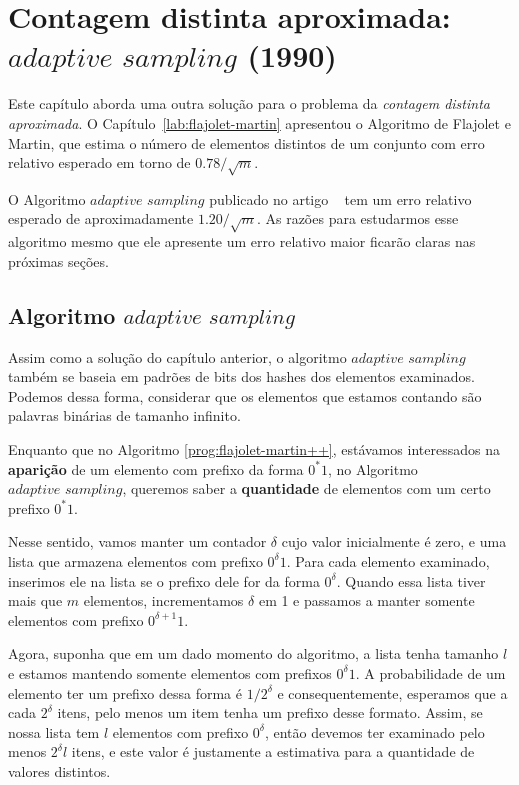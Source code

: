 \newcommand{\asampling}{\textit{adaptive sampling}}

\chapter{Contagem distinta aproximada: $\asampling$ (1990)}

Este capítulo aborda uma outra solução para o problema da \textit{contagem distinta aproximada}. O 
Capítulo~\ref{lab:flajolet-martin} apresentou o Algoritmo de Flajolet e Martin, que estima o número de elementos 
distintos de um conjunto com erro relativo esperado em torno de $0.78 / \sqrt{m}$. 

O Algoritmo $\asampling$ publicado no artigo ~\citep{adptive:sampling:90} tem um erro relativo esperado de 
aproximadamente $1.20 / \sqrt{m}$. As razões para estudarmos esse algoritmo mesmo que ele apresente um erro relativo 
maior ficarão claras nas próximas seções.

\section{Algoritmo $\asampling$}
\label{lab:chapter:04:01}

Assim como a solução do capítulo anterior, o algoritmo $\asampling$ também se baseia em padrões de bits dos hashes dos 
elementos examinados. Podemos dessa forma, considerar que os elementos que estamos contando são palavras binárias de 
tamanho infinito. 

Enquanto que no Algoritmo \ref{prog:flajolet-martin++}, estávamos interessados na \textbf{aparição} de um elemento com 
prefixo da forma $0^*1$, no Algoritmo $\asampling$, queremos saber a \textbf{quantidade} de elementos com um certo 
prefixo $0^*1$.

Nesse sentido, vamos manter um contador $\delta$ cujo valor inicialmente é zero, e uma lista que armazena elementos com 
prefixo $0^{\delta}1$. Para cada elemento examinado, inserimos ele na lista se o prefixo dele for da forma $0^{\delta}$.
Quando essa lista tiver mais que $m$ elementos, incrementamos $\delta$ em 1 e passamos a manter 
somente elementos com prefixo $0^{\delta + 1}1$.

Agora, suponha que em um dado momento do algoritmo, a lista tenha tamanho $l$ e estamos mantendo somente elementos com 
prefixos $0^{\delta}1$. A probabilidade de um elemento ter um prefixo dessa forma é $1 / 2^{\delta}$ e consequentemente,
esperamos que a cada $2^{\delta}$ itens, pelo menos um item tenha um prefixo desse formato. Assim, se nossa lista tem
$l$ elementos com prefixo $0^{\delta}$, então devemos ter examinado pelo menos $2^{\delta} l$ itens, e este valor é 
justamente a estimativa para a quantidade de valores distintos.